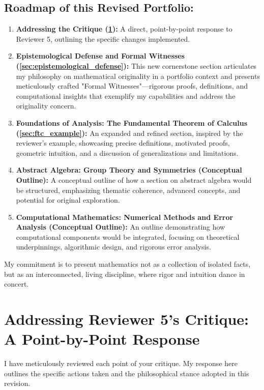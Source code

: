 \documentclass[11pt, a4paper]{article}
\theoremstyle{plain} %
\theoremstyle{definition} %
\theoremstyle{remark} %
\begin{document}
\subsection*{Roadmap of this Revised Portfolio:}
\begin{enumerate}
    \item \textbf{Addressing the Critique (\ref{sec:reviewer_response}):} A direct, point-by-point response to Reviewer 5, outlining the specific changes implemented.
    \item \textbf{Epistemological Defense and Formal Witnesses (\ref{sec:epistemological_defense}):} This new cornerstone section articulates my philosophy on mathematical originality in a portfolio context and presents meticulously crafted "Formal Witnesses"—rigorous proofs, definitions, and computational insights that exemplify my capabilities and address the originality concern.
    \item \textbf{Foundations of Analysis: The Fundamental Theorem of Calculus (\ref{sec:ftc_example}):} An expanded and refined section, inspired by the reviewer's example, showcasing precise definitions, motivated proofs, geometric intuition, and a discussion of generalizations and limitations.
    \item \textbf{Abstract Algebra: Group Theory and Symmetries (Conceptual Outline):} A conceptual outline of how a section on abstract algebra would be structured, emphasizing thematic coherence, advanced concepts, and potential for original exploration.
    \item \textbf{Computational Mathematics: Numerical Methods and Error Analysis (Conceptual Outline):} An outline demonstrating how computational components would be integrated, focusing on theoretical underpinnings, algorithmic design, and rigorous error analysis.
\end{enumerate}

My commitment is to present mathematics not as a collection of isolated facts, but as an interconnected, living discipline, where rigor and intuition dance in concert.

\newpage
\section{Addressing Reviewer 5's Critique: A Point-by-Point Response}
\label{sec:reviewer_response}

I have meticulously reviewed each point of your critique. My response here outlines the specific actions taken and the philosophical stance adopted in this revision.
\end{document}
